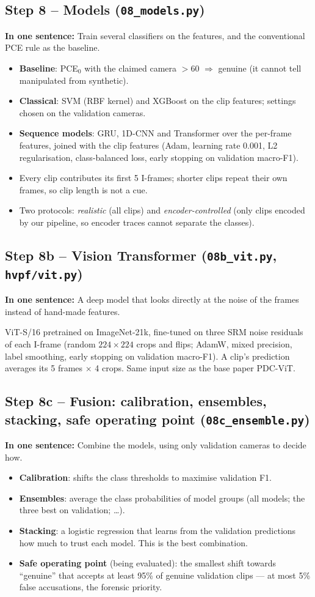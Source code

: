 \documentclass[11pt,a4paper]{article}
\newcommand{\say}[1]{\begin{onesentence}\small\textbf{In one sentence:} #1\end{onesentence}}
\begin{document}
\subsection{Step 8 -- Models (\texttt{08\_models.py})}
\say{Train several classifiers on the features, and the conventional PCE rule as the baseline.}
\begin{itemize}
\item \textbf{Baseline}: PCE$_0$ with the claimed camera $> 60$ $\Rightarrow$ genuine (it cannot tell manipulated from synthetic).
\item \textbf{Classical}: SVM (RBF kernel) and XGBoost on the clip features; settings chosen on the validation cameras.
\item \textbf{Sequence models}: GRU, 1D-CNN and Transformer over the per-frame features, joined with the clip features
      (Adam, learning rate 0.001, L2 regularisation, class-balanced loss, early stopping on validation macro-F1).
\item Every clip contributes its first 5 I-frames; shorter clips repeat their own frames, so clip length is not a cue.
\item Two protocols: \emph{realistic} (all clips) and \emph{encoder-controlled} (only clips encoded by our pipeline, so
      encoder traces cannot separate the classes).
\end{itemize}

\subsection{Step 8b -- Vision Transformer (\texttt{08b\_vit.py}, \texttt{hvpf/vit.py})}
\say{A deep model that looks directly at the noise of the frames instead of hand-made features.}
ViT-S/16 pretrained on ImageNet-21k, fine-tuned on three SRM noise residuals of each I-frame (random $224\times224$ crops and
flips; AdamW, mixed precision, label smoothing, early stopping on validation macro-F1). A clip's prediction averages its
5 frames $\times$ 4 crops. Same input size as the base paper PDC-ViT.

\subsection{Step 8c -- Fusion: calibration, ensembles, stacking, safe operating point (\texttt{08c\_ensemble.py})}
\say{Combine the models, using only validation cameras to decide how.}
\begin{itemize}
\item \textbf{Calibration}: shifts the class thresholds to maximise validation F1.
\item \textbf{Ensembles}: average the class probabilities of model groups (all models; the three best on validation; \dots).
\item \textbf{Stacking}: a logistic regression that learns from the validation predictions how much to trust each model.
      This is the best combination.
\item \textbf{Safe operating point} (being evaluated): the smallest shift towards ``genuine'' that accepts at least 95\% of genuine
      validation clips --- at most 5\% false accusations, the forensic priority.
\end{itemize}
\end{document}
